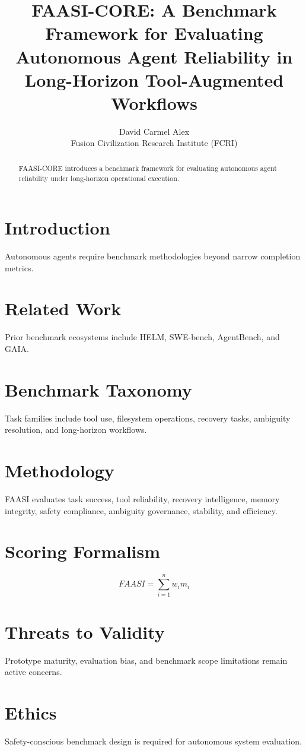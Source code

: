 \documentclass{article}
\title{FAASI-CORE: A Benchmark Framework for Evaluating Autonomous Agent Reliability in Long-Horizon Tool-Augmented Workflows}
\author{David Carmel Alex \\ Fusion Civilization Research Institute (FCRI)}
\date{}
\begin{document}
\maketitle

\begin{abstract}
FAASI-CORE introduces a benchmark framework for evaluating autonomous agent reliability under long-horizon operational execution.
\end{abstract}

\section{Introduction}
Autonomous agents require benchmark methodologies beyond narrow completion metrics.

\section{Related Work}
Prior benchmark ecosystems include HELM, SWE-bench, AgentBench, and GAIA.

\section{Benchmark Taxonomy}
Task families include tool use, filesystem operations, recovery tasks, ambiguity resolution, and long-horizon workflows.

\section{Methodology}
FAASI evaluates task success, tool reliability, recovery intelligence, memory integrity, safety compliance, ambiguity governance, stability, and efficiency.

\section{Scoring Formalism}
\[
FAASI = \sum_{i=1}^{n} w_i m_i
\]

\section{Threats to Validity}
Prototype maturity, evaluation bias, and benchmark scope limitations remain active concerns.

\section{Ethics}
Safety-conscious benchmark design is required for autonomous system evaluation.



\end{document}
